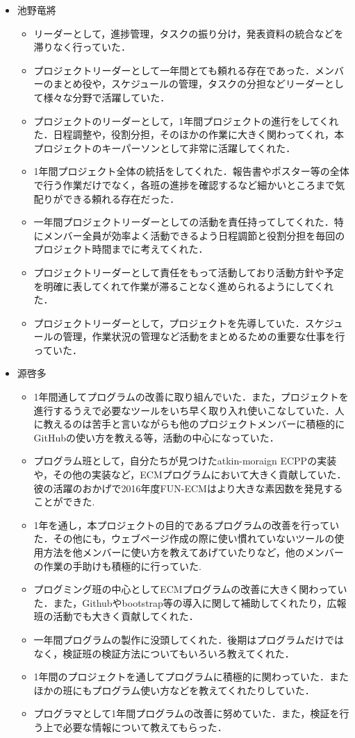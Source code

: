 \documentclass[openany,11pt,papersize]{jsbook}
\begin{document}
\begin{itemize}

\item 池野竜將
\begin{itemize}
\item リーダーとして，進捗管理，タスクの振り分け，発表資料の統合などを滞りなく行っていた．
\item プロジェクトリーダーとして一年間とても頼れる存在であった．メンバーのまとめ役や，スケジュールの管理，タスクの分担などリーダーとして様々な分野で活躍していた．
\item プロジェクトのリーダーとして，1年間プロジェクトの進行をしてくれた．日程調整や，役割分担，そのほかの作業に大きく関わってくれ，本プロジェクトのキーパーソンとして非常に活躍してくれた．
\item 1年間プロジェクト全体の統括をしてくれた．報告書やポスター等の全体で行う作業だけでなく，各班の進捗を確認するなど細かいところまで気配りができる頼れる存在だった．
\item 一年間プロジェクトリーダーとしての活動を責任持ってしてくれた．特にメンバー全員が効率よく活動できるよう日程調節と役割分担を毎回のプロジェクト時間までに考えてくれた．
\item プロジェクトリーダーとして責任をもって活動しており活動方針や予定を明確に表してくれて作業が滞ることなく進められるようにしてくれた．
\item プロジェクトリーダーとして，プロジェクトを先導していた．スケジュールの管理，作業状況の管理など活動をまとめるための重要な仕事を行っていた．
\end{itemize}

\item 源啓多
\begin{itemize}
\item 1年間通してプログラムの改善に取り組んでいた．また，プロジェクトを進行するうえで必要なツールをいち早く取り入れ使いこなしていた．人に教えるのは苦手と言いながらも他のプロジェクトメンバーに積極的にGitHubの使い方を教える等，活動の中心になっていた．
\item プログラム班として，自分たちが見つけたatkin-moraign ECPPの実装や，その他の実装など，ECMプログラムにおいて大きく貢献していた．彼の活躍のおかげで2016年度FUN-ECMはより大きな素因数を発見することができた.
\item 1年を通し，本プロジェクトの目的であるプログラムの改善を行っていた．その他にも，ウェブページ作成の際に使い慣れていないツールの使用方法を他メンバーに使い方を教えてあげていたりなど，他のメンバーの作業の手助けも積極的に行っていた.
\item プログミング班の中心としてECMプログラムの改善に大きく関わっていた．また，Githubやbootstrap等の導入に関して補助してくれたり，広報班の活動でも大きく貢献してくれた．
\item 一年間プログラムの製作に没頭してくれた．後期はプログラムだけではなく，検証班の検証方法についてもいろいろ教えてくれた．
\item 1年間のプロジェクトを通してプログラムに積極的に関わっていた．またほかの班にもプログラム使い方などを教えてくれたりしていた．
\item プログラマとして1年間プログラムの改善に努めていた．また，検証を行う上で必要な情報について教えてもらった．
\end{itemize}


\end{itemize}
\end{document}
